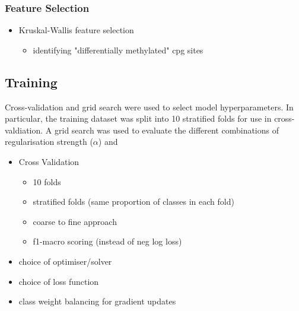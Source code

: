 \documentclass{article}
\begin{document}

\subsubsection{Feature Selection} \label{sec:feature-selection}
\begin{itemize}
    \item Kruskal-Wallis feature selection \cite{Kruskal1952UseOR}
          \begin{itemize}
              \item identifying "differentially methylated" cpg sites
          \end{itemize}
\end{itemize}

\subsection{Training} \label{sec:training}

Cross-validation and grid search were used to select model hyperparameters. In particular, the training dataset was split into 10 stratified folds for use in cross-valdiation. A grid search was used to evaluate the different combinations of regularisation strength (\(\alpha\)) and 

\cite{scikit-learn}
\begin{itemize}
    \item Cross Validation
          \begin{itemize}
              \item 10 folds
              \item stratified folds (same proportion of classes in each fold)
              \item coarse to fine approach
              \item f1-macro scoring (instead of neg log loss)
          \end{itemize}
    \item choice of optimiser/solver
    \item choice of loss function
    \item class weight balancing for gradient updates

\end{itemize}
\end{document}
